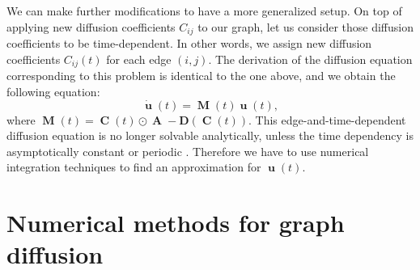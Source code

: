 \documentclass[12pt, oneside]{report}   	%
\DeclareMathOperator{\Adj}{\boldsymbol{A}}
\DeclareMathOperator{\CC}{\boldsymbol{C}}
\DeclareMathOperator{\MM}{\boldsymbol{M}}
\DeclareMathOperator{\uu}{\boldsymbol{u}}
\begin{document}
\noindent We can make further modifications to have a more generalized setup. On top of applying new diffusion coefficients $C_{ij}$ to our graph, let us consider those diffusion coefficients to be time-dependent. In other words, we assign new diffusion coefficients $C_{ij}(t)$ for each edge $(i,j)$. The derivation of the diffusion equation corresponding to this problem is identical to the one above, and we obtain the following equation:
\begin{equation}
\label{eq:nonconstanttime}
\dot{\uu}(t)=\MM(t)\uu(t),
\end{equation}
where $\MM(t)=\CC(t)\odot\Adj-\boldsymbol{D}(\CC(t))$. This edge-and-time-dependent diffusion equation is no longer solvable analytically, unless the time dependency is asymptotically constant or periodic \cite{floquet1883equations}. Therefore we have to use numerical integration techniques to find an approximation for $\uu(t)$.

\section{Numerical methods for graph diffusion}
\label{sec:num_methods}
\end{document}
